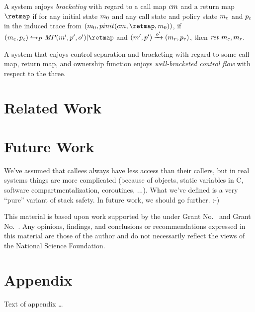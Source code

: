 \documentclass[acmsmall,review,anonymous]{acmart}\settopmatter{printfolios=true,printccs=false,printacmref=false}
\begin{document}
  
    A system enjoys {\em bracketing} with regard to a call map \(cm\) and
    a return map \(\retmap\) if for any initial state \(m_0\) and any
    call state and policy state \(m_c\) and \(p_c\) in the induced trace
    from \(\mpstate{\mach_0}{\pinit(\callmap,\retmap,\mach_0)}\), if
    \(\mpstate{\mach_c}{\pol_c} \hookrightarrow_P \MPT \mpostate{\mach'}
    {\pol'}{\obs'} | \retmap\) and \((m',p') \xrightarrow{o'}
    (m_r,p_r)\), then \(\mathit{ret}\ m_c,m_r\).


    A system that enjoys control separation and bracketing with regard to some
    call map, return map, and ownership function enjoys {\em well-bracketed
    control flow} with respect to the three.

\section{Related Work}
\label{sec:relwork}

\section{Future Work}
\label{sec:future}

We've assumed that callees always have less access than their callers, but
in real systems things are more complicated (because of objects, static
variables in C, software compartmentalization, coroutines, ...).  What we've
defined is a very ``pure'' variant of stack safety.  In future work, we
should go further. :-)


\begin{acks}                            %
  This material is based upon work supported by the
   under Grant
  No.~ and Grant
  No.~.  Any opinions, findings, and
  conclusions or recommendations expressed in this material are those
  of the author and do not necessarily reflect the views of the
  National Science Foundation.
\end{acks}


%


\appendix
\section{Appendix}

Text of appendix \ldots
\end{document}
